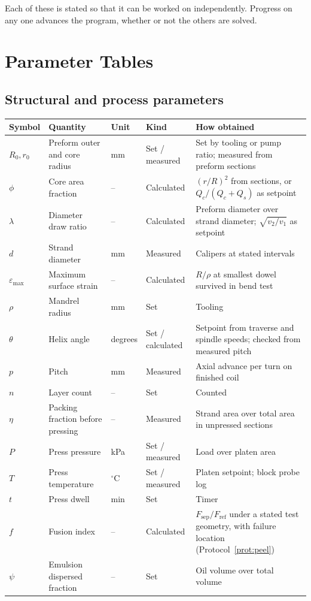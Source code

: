 \documentclass[11pt,openany]{book}
\theoremstyle{definition}
\begin{document}
Each of these is stated so that it can be worked on independently. Progress on any one advances the program, whether or not the others are solved.

\appendix

\chapter{Parameter Tables}\label{app:params}

\section{Structural and process parameters}

\begin{center}
\small
\begin{tabularx}{\linewidth}{@{}llllX@{}}
\toprule
Symbol & Quantity & Unit & Kind & How obtained \\
\midrule
$R_0, r_0$ & Preform outer and core radius & mm & Set / measured & Set by tooling or pump ratio; measured from preform sections \\
$\phi$ & Core area fraction & -- & Calculated & $(r/R)^2$ from sections, or $Q_c/(Q_c+Q_s)$ as setpoint \\
$\lambda$ & Diameter draw ratio & -- & Calculated & Preform diameter over strand diameter; $\sqrt{v_2/v_1}$ as setpoint \\
$d$ & Strand diameter & mm & Measured & Calipers at stated intervals \\
$\varepsilon_{\max}$ & Maximum surface strain & -- & Calculated & $R/\rho$ at smallest dowel survived in bend test \\
$\rho$ & Mandrel radius & mm & Set & Tooling \\
$\theta$ & Helix angle & degrees & Set / calculated & Setpoint from traverse and spindle speeds; checked from measured pitch \\
$p$ & Pitch & mm & Measured & Axial advance per turn on finished coil \\
$n$ & Layer count & -- & Set & Counted \\
$\eta$ & Packing fraction before pressing & -- & Measured & Strand area over total area in unpressed sections \\
$P$ & Press pressure & kPa & Set / measured & Load over platen area \\
$T$ & Press temperature & $^\circ$C & Set / measured & Platen setpoint; block probe log \\
$t$ & Press dwell & min & Set & Timer \\
$f$ & Fusion index & -- & Calculated & $F_{\text{sep}}/F_{\text{ref}}$ under a stated test geometry, with failure location (Protocol~\ref{prot:peel}) \\
$\psi$ & Emulsion dispersed fraction & -- & Set & Oil volume over total volume \\
\bottomrule
\end{tabularx}
\end{center}
\end{document}
